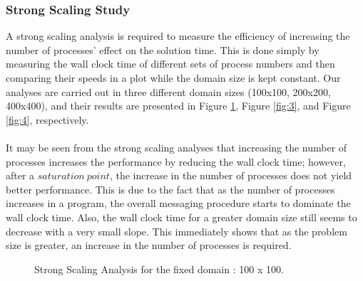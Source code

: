 \documentclass[12pt]{article}
\begin{document}
\subsubsection{Strong Scaling Study}
A strong scaling analysis is required to measure the efficiency of increasing the number of processes' effect on the solution time. This is done simply by measuring the wall clock time of different sets of process numbers and then comparing their speeds in a plot while the domain size is kept constant. Our analyses are carried out in three different domain sizes (100x100, 200x200, 400x400), and their results are presented in Figure \ref{fig:2}, Figure \ref{fig:3}, and Figure \ref{fig:4}, respectively.\\\\
It may be seen from the strong scaling analyses that increasing the number of processes increases the performance by reducing the wall clock time; however, after a $saturation\ point$, the increase in the number of processes does not yield better performance. This is due to the fact that as the number of processes increases in a program, the overall messaging procedure starts to dominate the wall clock time. Also, the wall clock time for a greater domain size still seems to decrease with a very small slope. This immediately shows that as the problem size is greater, an increase in the number of processes is required. 
\begin{figure}[h!]
\centering %
\caption{Strong Scaling Analysis for the fixed domain : 100 x 100.}
\label{fig:2}
\end{figure}
\end{document}
